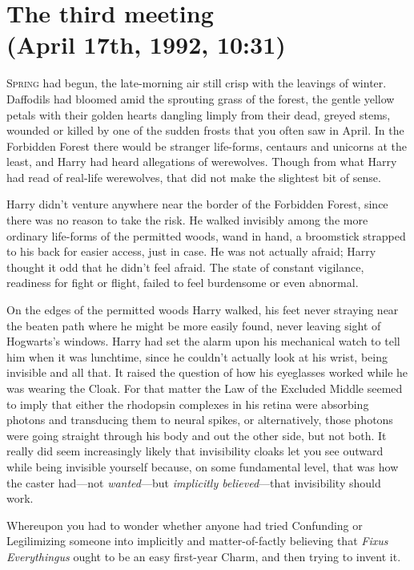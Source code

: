 
\section{The third meeting\\
(April 17th, 1992, 10:31\am)}

\lettrine{S}{pring} had begun, the late-morning air still crisp with the leavings of winter. Daffodils had bloomed amid the sprouting grass of the forest, the gentle yellow petals with their golden hearts dangling limply from their dead, greyed stems, wounded or killed by one of the sudden frosts that you often saw in April. In the Forbidden Forest there would be stranger life-forms, centaurs and unicorns at the least, and Harry had heard allegations of werewolves. Though from what Harry had read of real-life werewolves, that did not make the slightest bit of sense.

Harry didn't venture anywhere near the border of the Forbidden Forest, since there was no reason to take the risk. He walked invisibly among the more ordinary life-forms of the permitted woods, wand in hand, a broomstick strapped to his back for easier access, just in case. He was not actually afraid; Harry thought it odd that he didn't feel afraid. The state of constant vigilance, readiness for fight or flight, failed to feel burdensome or even abnormal.

On the edges of the permitted woods Harry walked, his feet never straying near the beaten path where he might be more easily found, never leaving sight of Hogwarts's windows. Harry had set the alarm upon his mechanical watch to tell him when it was lunchtime, since he couldn't actually look at his wrist, being invisible and all that. It raised the question of how his eyeglasses worked while he was wearing the Cloak. For that matter the Law of the Excluded Middle seemed to imply that either the rhodopsin complexes in his retina were absorbing photons and transducing them to neural spikes, or alternatively, those photons were going straight through his body and out the other side, but not both. It really did seem increasingly likely that invisibility cloaks let you see outward while being invisible yourself because, on some fundamental level, that was how the caster had---not \emph{wanted}---but \emph{implicitly believed}---that invisibility should work.

Whereupon you had to wonder whether anyone had tried Confunding or Legilimizing someone into implicitly and matter-of-factly believing that \emph{Fixus Everythingus} ought to be an easy first-year Charm, and then trying to invent it.

